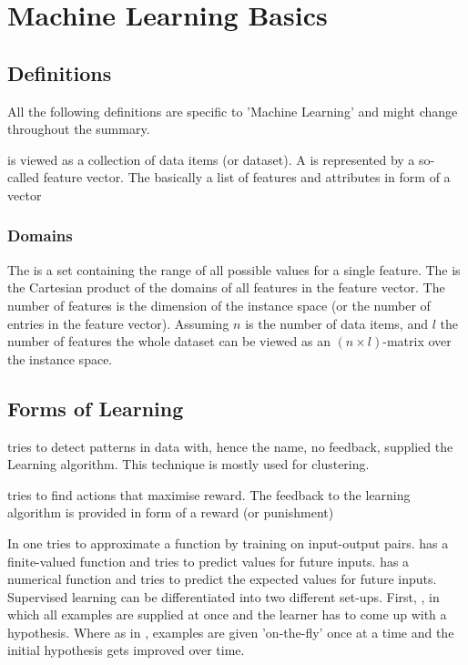 
\chapter{Machine Learning Basics}

\section{Definitions}
All the following definitions are specific to 'Machine Learning' and might change throughout the summary.


 is viewed as a collection of data items (or dataset). A  is represented by a so-called feature vector. The  basically a list of features and attributes in form of a vector 
\subsection{Domains}
The  is a set containing the range of all possible values for a single feature. The  is the Cartesian product of the domains of all features in the feature vector. The number of features is the dimension of the instance space (or the number of entries in the feature vector). 
Assuming $n$ is the number of data items, and $l$ the number of features the whole dataset can be viewed as an $(n \times l )$-matrix over the instance space.

\section{Forms of Learning}
 tries to detect patterns in data with, hence the name, no feedback, supplied the Learning algorithm. This technique is mostly used for clustering.

 tries to find actions that maximise reward. The feedback to the learning algorithm is provided in form of a reward (or punishment)

In  one tries to approximate a function by training on input-output pairs.  has a finite-valued function and tries to predict values for future inputs.  has a numerical function and tries to predict the expected values for future inputs. Supervised learning can be differentiated into two different set-ups. First, , in which all examples are supplied at once and the learner has to come up with a hypothesis. Where as in , examples are given 'on-the-fly' once at a time and the initial hypothesis gets improved over time.

